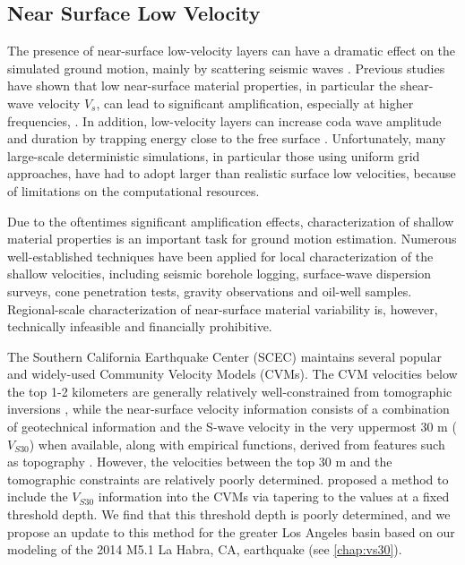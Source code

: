 \subsection{Near Surface Low Velocity}
The presence of near-surface low-velocity layers can have a dramatic effect on the simulated ground motion, mainly by scattering seismic waves . Previous studies have shown that low near-surface material properties, in particular the shear-wave velocity $V_s$, can lead to significant amplification, especially at higher frequencies, \citep{booreSiteAmplificationsGeneric1997,poggiDerivationReferenceShearWave2011}. In addition, low-velocity layers can increase coda wave amplitude and duration by trapping energy close to the free surface \citep{imperatoriBroadbandNearfieldGround2013}. Unfortunately, many large-scale deterministic simulations, in particular those using uniform grid approaches, have had to adopt larger than realistic surface low velocities, because of limitations on the computational resources.

Due to the oftentimes significant amplification effects, characterization of shallow material properties is an important task for ground motion estimation. Numerous well-established techniques have been applied for local characterization of the shallow velocities, including seismic borehole logging, surface-wave dispersion surveys, cone penetration tests, gravity observations and oil-well samples. Regional-scale characterization of near-surface material variability is, however, technically infeasible and financially prohibitive. 

The Southern California Earthquake Center (SCEC) maintains several popular and widely-used Community Velocity Models (CVMs). The CVM velocities below the top 1-2 kilometers are generally relatively well-constrained from tomographic inversions , while the near-surface velocity information consists of a combination of geotechnical information and the S-wave velocity in the very uppermost 30 m ($V_{S30}$) when available, along with empirical functions, derived from features such as topography . However, the velocities between the top 30 m and the tomographic constraints are relatively poorly determined. \citet{elyVs30derivedNearsurfaceSeismic2010} proposed a method to include the $V_{S30}$ information into the CVMs via tapering to the values at a fixed threshold depth. We find that this threshold depth is poorly determined, and we propose an update to this method for the greater Los Angeles basin based on our modeling of the 2014 M5.1 La Habra, CA, earthquake (see \cref{chap:vs30}). 

